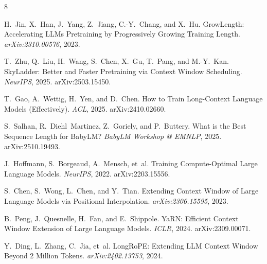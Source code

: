 \begin{thebibliography}{8}

H.~Jin, X.~Han, J.~Yang, Z.~Jiang, C.-Y.~Chang, and X.~Hu.
\newblock GrowLength: Accelerating LLMs Pretraining by Progressively Growing Training Length.
\newblock \textit{arXiv:2310.00576}, 2023.

T.~Zhu, Q.~Liu, H.~Wang, S.~Chen, X.~Gu, T.~Pang, and M.-Y.~Kan.
\newblock SkyLadder: Better and Faster Pretraining via Context Window Scheduling.
\newblock \textit{NeurIPS}, 2025. arXiv:2503.15450.

T.~Gao, A.~Wettig, H.~Yen, and D.~Chen.
\newblock How to Train Long-Context Language Models (Effectively).
\newblock \textit{ACL}, 2025. arXiv:2410.02660.

S.~Salhan, R.~Diehl~Martinez, Z.~Goriely, and P.~Buttery.
\newblock What is the Best Sequence Length for BabyLM?
\newblock \textit{BabyLM Workshop @ EMNLP}, 2025. arXiv:2510.19493.

J.~Hoffmann, S.~Borgeaud, A.~Mensch, et~al.
\newblock Training Compute-Optimal Large Language Models.
\newblock \textit{NeurIPS}, 2022. arXiv:2203.15556.

S.~Chen, S.~Wong, L.~Chen, and Y.~Tian.
\newblock Extending Context Window of Large Language Models via Positional Interpolation.
\newblock \textit{arXiv:2306.15595}, 2023.

B.~Peng, J.~Quesnelle, H.~Fan, and E.~Shippole.
\newblock YaRN: Efficient Context Window Extension of Large Language Models.
\newblock \textit{ICLR}, 2024. arXiv:2309.00071.

Y.~Ding, L.~Zhang, C.~Jia, et~al.
\newblock LongRoPE: Extending LLM Context Window Beyond 2 Million Tokens.
\newblock \textit{arXiv:2402.13753}, 2024.

\end{thebibliography}
